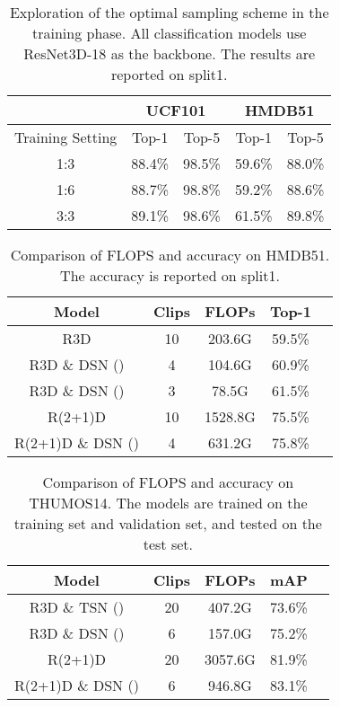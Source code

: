 \documentclass[journal]{IEEEtran}
\begin{document}
\begin{table}[t]
\centering
\caption{Exploration of the optimal sampling scheme in the training phase. All classification models use ResNet3D-18 as the backbone. The results are reported on split1.}
\begin{tabular}{ccccc}
\toprule[2pt]
&\multicolumn{2}{c}{UCF101} & \multicolumn{2}{c}{HMDB51} \\
\hline
Training Setting &Top-1&Top-5&Top-1&Top-5\\
\hline
1:3& 88.4\% & 98.5\% & 59.6\% & 88.0\%\\
\hline
1:6 & 88.7\% & 98.8\% & 59.2\% & 88.6\%\\
\hline
3:3 & 89.1\% & 98.6\% & 61.5\% & 89.8\%\\
\bottomrule[2pt]
\end{tabular}
\label{tab:train}
\end{table}

\begin{table}[h]
\centering
\caption{Comparison of FLOPS and accuracy on HMDB51. The accuracy is reported on split1.}
\begin{tabular}{ccccc}
\toprule[2pt]
Model & Clips & FLOPs & Top-1\\
\midrule
R3D &10& 203.6G &  59.5\% \\
R3D \& DSN ()&4& 104.6G &60.9\%\\
R3D \& DSN ()&3& 78.5G&61.5\% \\
\midrule
R(2+1)D &10& 1528.8G & 75.5\% \\
R(2+1)D \& DSN ()&4& 631.2G& 75.8\%\\
\bottomrule[2pt]
\end{tabular}
\vspace{2mm}
\label{tab:flops_hmdb}
\end{table}

\begin{table}[h]
\centering
\caption{Comparison of FLOPS and accuracy on THUMOS14. The models are trained on the training set and validation set, and tested on the test set.}
\begin{tabular}{ccccc}
\toprule[2pt]
Model & Clips & FLOPs &  mAP\\
\midrule
R3D \& TSN () &20& 407.2G & 73.6\% \\
R3D \& DSN ()&6& 157.0G& 75.2\%\\
\midrule
R(2+1)D &20& 3057.6G & 81.9\%\\
R(2+1)D \& DSN ()&6& 946.8G& 83.1\%\\
\bottomrule[2pt]
\end{tabular}
\vspace{2mm}
\label{tab:flops_thumos}
\end{table}
\end{document}
